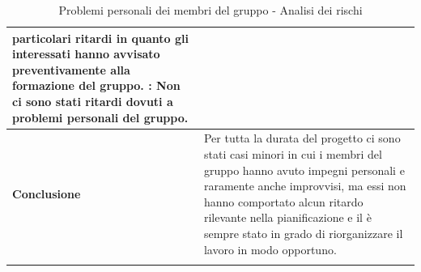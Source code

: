 \documentclass[12pt,a4paper]{article}
\begin{document}
\begin{center}
\begin{longtable}[H]{p{} p{}}
          		particolari ritardi in quanto gli interessati hanno avvisato preventivamente alla 
          		formazione del gruppo. \newline
          	\textbf{\FVV{}}: Non ci sono stati ritardi dovuti a problemi personali del gruppo. \\*
		\midrule
		\textbf{Conclusione} & Per tutta la durata del progetto ci sono stati casi minori in cui i membri del gruppo hanno avuto impegni personali e raramente anche improvvisi, ma essi non hanno comportato alcun ritardo rilevante nella pianificazione e il \PM{} è sempre stato in grado di riorganizzare il lavoro in modo opportuno. \\*
		\bottomrule
		\caption{Problemi personali dei membri del gruppo - Analisi dei rischi}
	\end{longtable}
\end{center}
\end{document}
